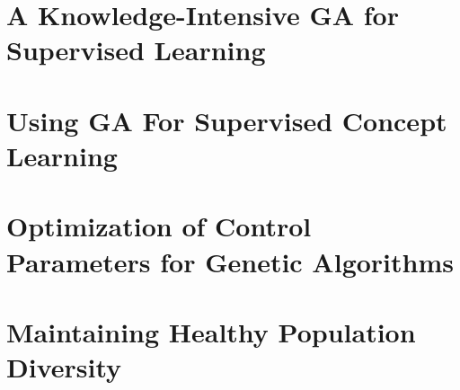 \documentclass[a4paper, 10pt, oneside]{article}
\theoremstyle{definition}
\begin{document}
\section{A Knowledge-Intensive GA for Supervised Learning}


\section{Using GA For Supervised Concept Learning}


\section{Optimization of Control Parameters for Genetic Algorithms}


\section{Maintaining Healthy Population Diversity}


\newpage
\appendix
\printbibliography
\end{document}
